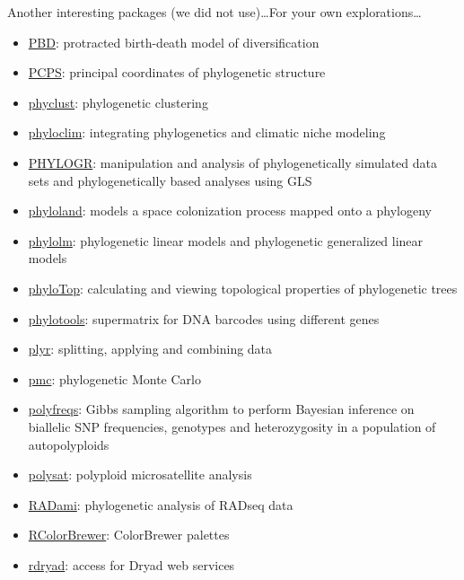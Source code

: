 \documentclass[compress, ucs, xelatex, 11pt, xcolor=svgnames,
  hyperref={
    bookmarks=true,
    unicode=true,
    colorlinks=true,
    pdftitle={Molecular data in R},
    plainpages=false,
    pdfauthor={Vojtech Zeisek},
    pdfsubject={Course about phylogeny and evolution in R},
    pdfcreator={XeLaTeX},
    pdfkeywords={R, evolution, phylogeny, molecular data},
    linkcolor=Tomato,
    anchorcolor=SaddleBrown,
    citecolor=Goldenrod,
    filecolor=DarkMagenta,
    menucolor=Sienna,
    urlcolor=DarkTurquoise,
    pdftex},
  url={hyphens, lowtilde} %
  ]{beamer}
\begin{document}
\begin{frame}[allowframebreaks]{Another interesting packages (we did not use)\ldots}{For your own explorations\ldots}
\begin{itemize}
    \item \href{https://cran.r-project.org/package=PBD}{PBD}: protracted birth-death model of diversification
    \item \href{https://cran.r-project.org/package=PCPS}{PCPS}: principal coordinates of phylogenetic structure
    \item \href{https://cran.r-project.org/package=phyclust}{phyclust}: phylogenetic clustering
    \item \href{https://cran.r-project.org/package=phyloclim}{phyloclim}: integrating phylogenetics and climatic niche modeling
    \item \href{https://cran.r-project.org/package=PHYLOGR}{PHYLOGR}: manipulation and analysis of phylogenetically simulated data sets and phylogenetically based analyses using GLS
    \item \href{https://cran.r-project.org/package=phyloland}{phyloland}: models a space colonization process mapped onto a phylogeny
    \item \href{https://cran.r-project.org/package=phylolm}{phylolm}: phylogenetic linear models and phylogenetic generalized linear models
    \item \href{https://cran.r-project.org/package=phyloTop}{phyloTop}: calculating and viewing topological properties of phylogenetic trees
    \item \href{https://cran.r-project.org/package=phylotools}{phylotools}: supermatrix for DNA barcodes using different genes
    \item \href{https://cran.r-project.org/package=plyr}{plyr}: splitting, applying and combining data
    \item \href{https://cran.r-project.org/package=pmc}{pmc}: phylogenetic Monte Carlo
    \item \href{https://cran.r-project.org/package=polyfreqs}{polyfreqs}: Gibbs sampling algorithm to perform Bayesian inference on biallelic SNP frequencies, genotypes and heterozygosity in a population of autopolyploids
    \item \href{https://cran.r-project.org/package=polysat}{polysat}: polyploid microsatellite analysis
    \item \href{https://cran.r-project.org/package=RADami}{RADami}: phylogenetic analysis of RADseq data
    \item \href{https://cran.r-project.org/package=RColorBrewer}{RColorBrewer}: ColorBrewer palettes
    \item \href{https://cran.r-project.org/package=rdryad}{rdryad}: access for Dryad web services

\end{itemize}
\end{frame}
\end{document}
